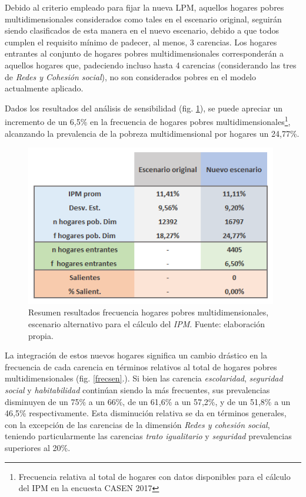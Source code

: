 \documentclass[12pt,letterpaper,spanish]{article}
\begin{document}
Debido al criterio empleado para fijar la nueva LPM, aquellos hogares pobres multidimensionales considerados como tales en el escenario original, seguirán siendo clasificados de esta manera en el nuevo escenario, debido a que todos cumplen el requisito mínimo de padecer, al menos, 3 carencias. Los hogares entrantes al conjunto de hogares pobres multidimensionales corresponderán a aquellos hogares que, padeciendo incluso hasta 4 carencias (considerando las tres de \textit{Redes y Cohesión social}), no son considerados pobres en el modelo actualmente aplicado. 

Dados los resultados del análisis de sensibilidad (fig. \ref{resusensible}), se puede apreciar un incremento de un 6,5\% en la frecuencia de hogares pobres multidimensionales\footnote{Frecuencia relativa al total de hogares con datos disponibles para el cálculo del IPM en la encuesta CASEN 2017}, alcanzando la prevalencia de la pobreza multidimensional por hogares un 24,77\%. 



\begin{figure}[H]
    \centering
        \includegraphics[width=11cm]{Max/estadistica_escenario.png}
    \caption{Resumen resultados frecuencia hogares pobres multidimensionales, escenario alternativo para el cálculo del \textit{IPM}. Fuente: elaboración propia.}
    \label{resusensible}
\end{figure}



La integración de estos nuevos hogares significa un cambio drástico en la frecuencia de cada carencia en términos relativos al total de hogares pobres multidimensionales (fig. \ref{frecsen}.). Si bien las carencia \textit{escolaridad}, \textit{seguridad social} y \textit{habitabilidad} continúan siendo la más frecuentes, sus prevalencias disminuyen de un 75\% a un 66\%, de un 61,6\% a un 57,2\%, y de un 51,8\% a un 46,5\% respectivamente. Esta disminución relativa se da en términos generales, con la excepción de las carencias de la dimensión \textit{Redes y cohesión social}, teniendo particularmente las carencias \textit{trato igualitario} y \textit{seguridad} prevalencias superiores al 20\%.
\end{document}
